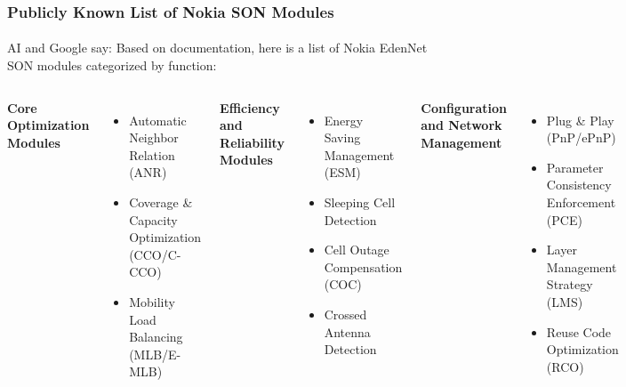 \begin{verblatex}

\begin{frame}[fragile,plain,label=nokiaSonModules]
    \frametitle{Publicly Known List of Nokia SON Modules}
    \framesubtitle{}

AI and Google say:
Based on documentation, here is a list of Nokia EdenNet SON modules categorized by function:

\bigskip

{\small
\begin{columns}[T]

\textbf{Core Optimization Modules}
\begin{itemize}
  \item Automatic Neighbor Relation (ANR)
  \item Coverage \& Capacity Optimization (CCO/C-CCO)
  \item Mobility Load Balancing (MLB/E-MLB)
\end{itemize}


\textbf{Efficiency and Reliability Modules}
\begin{itemize}
  \item Energy Saving Management (ESM)
  \item Sleeping Cell Detection
  \item Cell Outage Compensation (COC)
  \item Crossed Antenna Detection
\end{itemize}


\textbf{Configuration and Network Management}
\begin{itemize}
  \item Plug \& Play (PnP/ePnP)
  \item Parameter Consistency Enforcement (PCE)
  \item Layer Management Strategy (LMS)
  \item Reuse Code Optimization (RCO)
\end{itemize}

\end{columns}
}



\end{frame}
\end{verblatex}
